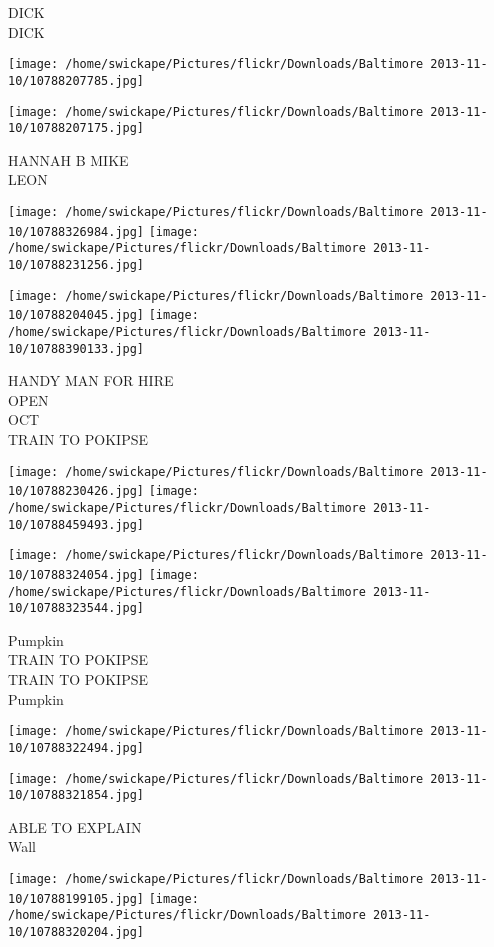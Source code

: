 \documentclass[10pt,letterpaper]{article}
\begin{document}
DICK\\
DICK
\pagebreak

\texttt{[image: /home/swickape/Pictures/flickr/Downloads/Baltimore 2013-11-10/10788207785.jpg]}

\vspace{0.25in}
\texttt{[image: /home/swickape/Pictures/flickr/Downloads/Baltimore 2013-11-10/10788207175.jpg]}

HANNAH B MIKE\\
LEON
\pagebreak

\texttt{[image: /home/swickape/Pictures/flickr/Downloads/Baltimore 2013-11-10/10788326984.jpg]}
\texttt{[image: /home/swickape/Pictures/flickr/Downloads/Baltimore 2013-11-10/10788231256.jpg]}

\texttt{[image: /home/swickape/Pictures/flickr/Downloads/Baltimore 2013-11-10/10788204045.jpg]}
\texttt{[image: /home/swickape/Pictures/flickr/Downloads/Baltimore 2013-11-10/10788390133.jpg]}

HANDY MAN FOR HIRE\\
OPEN\\
OCT\\
TRAIN TO POKIPSE
\pagebreak

\texttt{[image: /home/swickape/Pictures/flickr/Downloads/Baltimore 2013-11-10/10788230426.jpg]}
\texttt{[image: /home/swickape/Pictures/flickr/Downloads/Baltimore 2013-11-10/10788459493.jpg]}

\texttt{[image: /home/swickape/Pictures/flickr/Downloads/Baltimore 2013-11-10/10788324054.jpg]}
\texttt{[image: /home/swickape/Pictures/flickr/Downloads/Baltimore 2013-11-10/10788323544.jpg]}

Pumpkin\\
TRAIN TO POKIPSE\\
TRAIN TO POKIPSE\\
Pumpkin
\pagebreak

\texttt{[image: /home/swickape/Pictures/flickr/Downloads/Baltimore 2013-11-10/10788322494.jpg]}

\vspace{0.25in}
\texttt{[image: /home/swickape/Pictures/flickr/Downloads/Baltimore 2013-11-10/10788321854.jpg]}

ABLE TO EXPLAIN\\
Wall
\pagebreak

\texttt{[image: /home/swickape/Pictures/flickr/Downloads/Baltimore 2013-11-10/10788199105.jpg]}
\texttt{[image: /home/swickape/Pictures/flickr/Downloads/Baltimore 2013-11-10/10788320204.jpg]}
\end{document}
